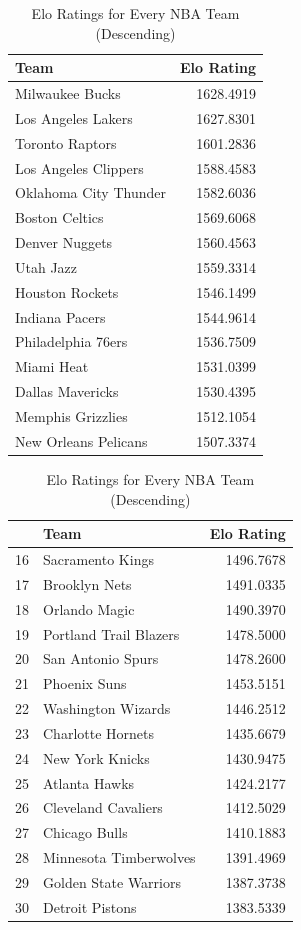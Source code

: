 \documentclass[]{article}
\begin{document}
\begin{table}
\caption{Elo Ratings for Every NBA Team (Descending)}

\centering
\begin{tabular}[t]{l|r}
\hline
Team & Elo Rating\\
\hline
Milwaukee Bucks & 1628.4919\\
\hline
Los Angeles Lakers & 1627.8301\\
\hline
Toronto Raptors & 1601.2836\\
\hline
Los Angeles Clippers & 1588.4583\\
\hline
Oklahoma City Thunder & 1582.6036\\
\hline
Boston Celtics & 1569.6068\\
\hline
Denver Nuggets & 1560.4563\\
\hline
Utah Jazz & 1559.3314\\
\hline
Houston Rockets & 1546.1499\\
\hline
Indiana Pacers & 1544.9614\\
\hline
Philadelphia 76ers & 1536.7509\\
\hline
Miami Heat & 1531.0399\\
\hline
Dallas Mavericks & 1530.4395\\
\hline
Memphis Grizzlies & 1512.1054\\
\hline
New Orleans Pelicans & 1507.3374\\
\hline
\end{tabular}
\centering
\begin{tabular}[t]{l|l|r}
\hline
  & Team & Elo Rating\\
\hline
16 & Sacramento Kings & 1496.7678\\
\hline
17 & Brooklyn Nets & 1491.0335\\
\hline
18 & Orlando Magic & 1490.3970\\
\hline
19 & Portland Trail Blazers & 1478.5000\\
\hline
20 & San Antonio Spurs & 1478.2600\\
\hline
21 & Phoenix Suns & 1453.5151\\
\hline
22 & Washington Wizards & 1446.2512\\
\hline
23 & Charlotte Hornets & 1435.6679\\
\hline
24 & New York Knicks & 1430.9475\\
\hline
25 & Atlanta Hawks & 1424.2177\\
\hline
26 & Cleveland Cavaliers & 1412.5029\\
\hline
27 & Chicago Bulls & 1410.1883\\
\hline
28 & Minnesota Timberwolves & 1391.4969\\
\hline
29 & Golden State Warriors & 1387.3738\\
\hline
30 & Detroit Pistons & 1383.5339\\
\hline
\end{tabular}
\end{table}
\end{document}
